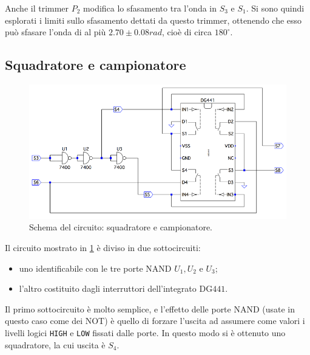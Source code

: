 \documentclass[a4paper,10pt]{article}
\def\code#1{\texttt{#1}}
\begin{document}
Anche il trimmer $P_2$ modifica lo sfasamento tra l'onda in $S_3$ e $S_1$. Si sono quindi esplorati i limiti sullo sfasamento dettati da questo trimmer, ottenendo che esso può sfasare l'onda di al più $2.70\pm0.08 rad$, cioè di circa $180^\circ$. 




\subsection{Squadratore e campionatore}

\begin{figure}[H]
	\centering
	\includegraphics[width=\textwidth]{../grafici/SqSamp.png}
	\caption{Schema del circuito: squadratore e campionatore.}
	\label{fig:sqsamp}
\end{figure}

Il circuito mostrato in \cref{fig:sqsamp} è diviso in due sottocircuiti:
\begin{itemize}
	\item uno identificabile con le tre porte NAND $ U_1, U_2 $ e $ U_3 $;
	\item l'altro costituito dagli interruttori dell'integrato DG$ 441 $.
\end{itemize}

Il primo sottocircuito è molto semplice, e l'effetto delle porte NAND (usate in questo caso come dei NOT) è quello di forzare l'uscita ad assumere come valori i livelli logici \code{HIGH} e \code{LOW} fissati dalle porte.
In questo modo si è ottenuto uno squadratore, la cui uscita è $ S_4 $.
\end{document}
